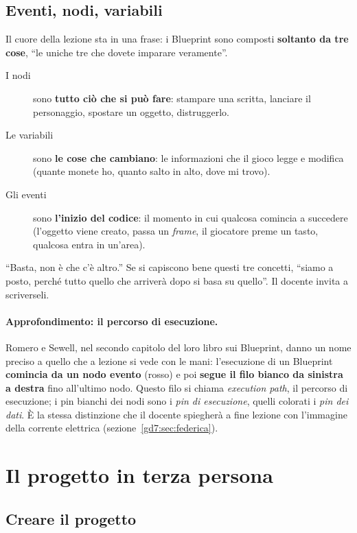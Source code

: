 \subsection{Eventi, nodi, variabili}

Il cuore della lezione sta in una frase: i Blueprint sono composti
\textbf{soltanto da tre cose}, ``le uniche tre che dovete imparare
veramente''.
\begin{description}
  \item[I nodi] sono \textbf{tutto ciò che si può fare}: stampare una
        scritta, lanciare il personaggio, spostare un oggetto, distruggerlo.
  \item[Le variabili] sono \textbf{le cose che cambiano}: le informazioni che
        il gioco legge e modifica (quante monete ho, quanto salto in alto,
        dove mi trovo).
  \item[Gli eventi] sono \textbf{l'inizio del codice}: il momento in cui
        qualcosa comincia a succedere (l'oggetto viene creato, passa un
        \emph{frame}, il giocatore preme un tasto, qualcosa entra in
        un'area).
\end{description}
``Basta, non è che c'è altro.'' Se si capiscono bene questi tre concetti,
``siamo a posto, perché tutto quello che arriverà dopo si basa su quello''.
Il docente invita a scriverseli.

\paragraph{Approfondimento: il percorso di esecuzione.} Romero e Sewell, nel
secondo capitolo del loro libro sui Blueprint, danno un nome preciso a quello
che a lezione si vede con le mani: l'esecuzione di un Blueprint
\textbf{comincia da un nodo evento} (rosso) e poi \textbf{segue il filo
bianco da sinistra a destra} fino all'ultimo nodo. Questo filo si chiama
\emph{execution path}, il percorso di esecuzione; i pin bianchi dei nodi sono
i \emph{pin di esecuzione}, quelli colorati i \emph{pin dei dati}. È la stessa
distinzione che il docente spiegherà a fine lezione con l'immagine della
corrente elettrica (sezione~\ref{gd7:sec:federica}).

\section{Il progetto in terza persona}
\label{gd7:sec:progetto}

\subsection{Creare il progetto}

